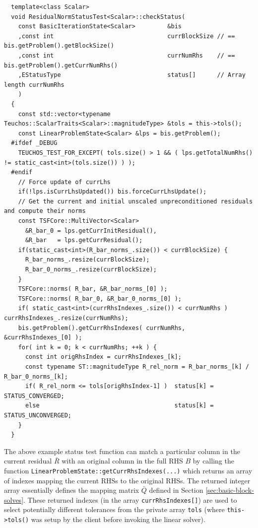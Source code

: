 \documentclass[pdf,ps2pdf,11pt]{SANDreport}
\begin{document}
\begin{enumerate}
{\scriptsize\begin{verbatim}
  template<class Scalar>
  void ResidualNormStatusTest<Scalar>::checkStatus(
    const BasicIterationState<Scalar>         &bis
    ,const int                                currBlockSize // == bis.getProblem().getBlockSize()
    ,const int                                currNumRhs    // == bis.getProblem().getCurrNumRhs()
    ,EStatusType                              status[]      // Array length currNumRhs
    )
  {
    const std::vector<typename Teuchos::ScalarTraits<Scalar>::magnitudeType> &tols = this->tols();
    const LinearProblemState<Scalar> &lps = bis.getProblem();
  #ifdef _DEBUG
    TEUCHOS_TEST_FOR_EXCEPT( tols.size() > 1 && ( lps.getTotalNumRhs() != static_cast<int>(tols.size()) ) );
  #endif
    // Force update of currLhs
    if(!lps.isCurrLhsUpdated()) bis.forceCurrLhsUpdate();  
    // Get the current and initial unscaled unpreconditioned residuals and compute their norms
    const TSFCore::MultiVector<Scalar>
      &R_bar_0 = lps.getCurrInitResidual(),
      &R_bar   = lps.getCurrResidual();
    if(static_cast<int>(R_bar_norms_.size()) < currBlockSize) {
      R_bar_norms_.resize(currBlockSize);
      R_bar_0_norms_.resize(currBlockSize);
    }
    TSFCore::norms( R_bar, &R_bar_norms_[0] );
    TSFCore::norms( R_bar_0, &R_bar_0_norms_[0] );
    if( static_cast<int>(currRhsIndexes_.size()) < currNumRhs ) currRhsIndexes_.resize(currNumRhs);
    bis.getProblem().getCurrRhsIndexes( currNumRhs, &currRhsIndexes_[0] );
    for( int k = 0; k < currNumRhs; ++k ) {
      const int origRhsIndex = currRhsIndexes_[k];
      const typename ST::magnitudeType R_rel_norm = R_bar_norms_[k] / R_bar_0_norms_[k];
      if( R_rel_norm <= tols[origRhsIndex-1] )  status[k] = STATUS_CONVERGED;
      else                                      status[k] = STATUS_UNCONVERGED;
    }
  }
\end{verbatim}}

The above example status test function can match a particular column
in the current residual $\bar{R}$ with an original column in the full
RHS $B$ by calling the function
{}\texttt{Linear\-Problem\-State::\-get\-Curr\-Rhs\-Indexes(...)}
which returns an array of indexes mapping the current RHSs to the
original RHSs.  The returned integer array essentially defines the
mapping matrix $\bar{Q}$ defined in Section
{}\ref{sec:basic-block-solves}.  These returned indexes (in the array
{}\texttt{currRhsIndexes[]}) are used to select potentially different
tolerances from the private array {}\texttt{tols} (where
{}\texttt{this->tols()} was setup by the client before invoking the
linear solver).


\end{enumerate}
\end{document}
